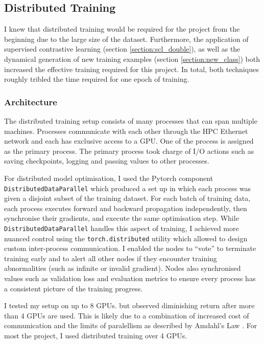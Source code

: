 \documentclass[12pt,a4paper,twoside,openany]{report}
\begin{document}
\subsection{Distributed Training}
I knew that distributed training would be required for the project from the beginning due to the large size of the dataset. Furthermore, the application of supervised contrastive learning (section \ref{section:scl_double}), as well as the dynamical generation of new training examples (section \ref{section:new_class}) both  increased the effective training required for this project. In total, both techniques roughly tribled the time required for one epoch of training. 

\subsubsection{Architecture}
The distributed training setup consists of many processes that can span multiple machines. Processes communicate with each other through the HPC Ethernet network and each has exclusive access to a GPU. One of the process is assigned as the primary process. The primary process took charge of I/O actions such as saving checkpoints, logging and passing values to other processes. 

For distributed model optimisation, I used the Pytorch component \verb|DistributedDataParallel| which produced a set up in which each process was given a disjoint subset of the training dataset. For each batch of training data, each process executes forward and backward propagation independently, then synchronise their gradients, and execute the same optimisation step. While \verb|DistributedDataParallel| handles this aspect of training, I achieved more nuanced control using the \verb|torch.distributed| utility which allowed to design custom inter-process communication. I enabled the nodes to ``vote'' to terminate training early and to alert all other nodes if they encounter training abnormalities (such as infinite or invalid gradient). Nodes also synchronised values such as validation loss and evaluation metrics to ensure every process has a consistent picture of the training progress. 

 I tested my setup on up to 8 GPUs. but observed diminishing return after more than 4 GPUs are used. This is likely due to a combination of increased cost of communication and the limits of paralellism as described by Amdahl's Law \cite{amdahl_validity_1967}. For most the project, I used distributed training over 4 GPUs. 
\end{document}
